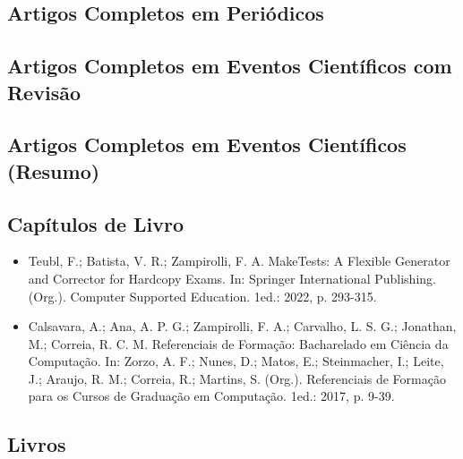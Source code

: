 
\subsection{Artigos Completos em Periódicos}




\subsection{Artigos Completos em Eventos Científicos com Revisão}



\subsection{Artigos Completos em Eventos Científicos (Resumo)}



\subsection{Capítulos de Livro}

\begin{itemize}
    \item Teubl, F.; Batista, V. R.; Zampirolli, F. A. MakeTests: A Flexible Generator and Corrector for Hardcopy Exams. In: Springer International Publishing. (Org.). Computer Supported Education. 1ed.: 2022, p. 293-315.
    \item Calsavara, A.; Ana, A. P. G.; Zampirolli, F. A.; Carvalho, L. S. G.; Jonathan, M.; Correia, R. C. M. Referenciais de Formação: Bacharelado em Ciência da Computação. In: Zorzo, A. F.; Nunes, D.; Matos, E.; Steinmacher, I.; Leite, J.; Araujo, R. M.; Correia, R.; Martins, S. (Org.). Referenciais de Formação para os Cursos de Graduação em Computação. 1ed.: 2017, p. 9-39.
\end{itemize}

\subsection{Livros}

